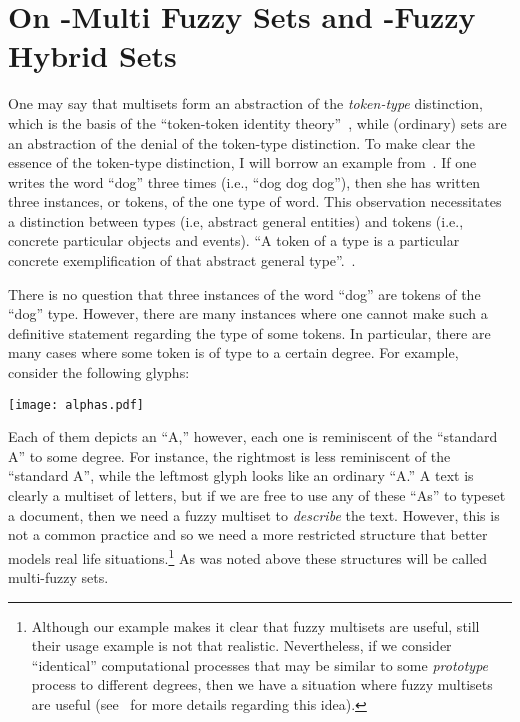 \documentclass{amsart}
\theoremstyle{definition}
\begin{document}
\section{On -Multi Fuzzy Sets and -Fuzzy Hybrid Sets}
One may say that multisets form an abstraction of the {\em token-type}
distinction, which is the basis of the ``token-token identity 
theory''~\cite{searle04}, while (ordinary) sets are an abstraction of the 
denial of the token-type distinction. To make clear the essence of the 
token-type distinction, I will borrow an example from~\cite{searle04}. If 
one writes the word ``dog'' three times (i.e., ``dog dog dog''), then she 
has written three instances, or tokens, of the one type of word. This observation 
necessitates a distinction between types (i.e, abstract general entities) and tokens
(i.e., concrete particular objects and events). ``A token of a type is
a particular concrete exemplification of that abstract general 
type''.~\cite[page 59]{searle04}. 

There is no question that three instances of the word ``dog'' are tokens 
of the ``dog'' type. However, there are many instances where one cannot make
such a definitive statement regarding the type of some tokens. In particular,
there are many cases where some token  is of type  to a certain degree.
For example, consider the following glyphs:
\begin{center}
\texttt{[image: alphas.pdf]}
\end{center}
Each of them depicts an ``A,'' however, each one is reminiscent of the ``standard A'' to 
some degree. For instance, the rightmost is less reminiscent of the ``standard A'', while
the leftmost glyph looks like an ordinary ``A.'' A text is clearly a multiset of letters,
but if we are free to use any of these ``As'' to typeset a document, then we need a
fuzzy multiset to {\em describe} the text. However, this is not a common practice and
so we need a more restricted structure that better models real life 
situations.\footnote{Although our example makes it clear that fuzzy multisets are useful,
still their usage example is not that realistic. Nevertheless, if we consider ``identical'' 
computational processes that may be similar to some {\em prototype} process to different degrees, 
then we have a situation where fuzzy multisets are useful (see~\cite{syropoulos2009} for more details regarding this idea).} As was noted above these structures will be called multi-fuzzy sets. 
\end{document}
